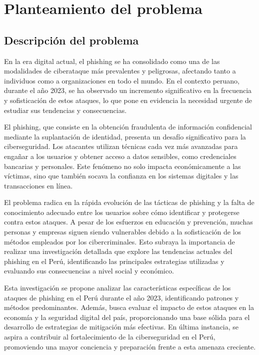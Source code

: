 
\chapter{Planteamiento del problema}

\section{Descripción del problema}

En la era digital actual, el phishing se ha consolidado como una de las 
modalidades de ciberataque más prevalentes y peligrosas, afectando tanto 
a individuos como a organizaciones en todo el mundo. En el contexto peruano,
durante el año 2023, se ha observado un incremento significativo en la 
frecuencia y sofisticación de estos ataques, lo que pone en evidencia 
la necesidad urgente de estudiar sus tendencias y consecuencias.

El phishing, que consiste en la obtención fraudulenta de información 
confidencial mediante la suplantación de identidad, presenta un desafío 
significativo para la ciberseguridad. Los atacantes utilizan técnicas 
cada vez más avanzadas para engañar a los usuarios y obtener acceso a 
datos sensibles, como credenciales bancarias y personales. Este 
fenómeno no solo impacta económicamente a las víctimas, sino que 
también socava la confianza en los sistemas digitales y las transacciones 
en línea.

El problema radica en la rápida evolución de las tácticas de phishing y 
la falta de conocimiento adecuado entre los usuarios sobre cómo identificar 
y protegerse contra estos ataques. A pesar de los esfuerzos en educación 
y prevención, muchas personas y empresas siguen siendo vulnerables debido 
a la sofisticación de los métodos empleados por los cibercriminales. Esto 
subraya la importancia de realizar una investigación detallada que explore 
las tendencias actuales del phishing en el Perú, identificando las 
principales estrategias utilizadas y evaluando sus consecuencias a nivel 
social y económico.

Esta investigación se propone analizar las características específicas 
de los ataques de phishing en el Perú durante el año 2023, identificando 
patrones y métodos predominantes. Además, busca evaluar el impacto 
de estos ataques en la economía y la seguridad digital del país, 
proporcionando una base sólida para el desarrollo de estrategias de 
mitigación más efectivas. En última instancia, se aspira a contribuir al 
fortalecimiento de la ciberseguridad en el Perú, promoviendo una mayor 
conciencia y preparación frente a esta amenaza creciente.


